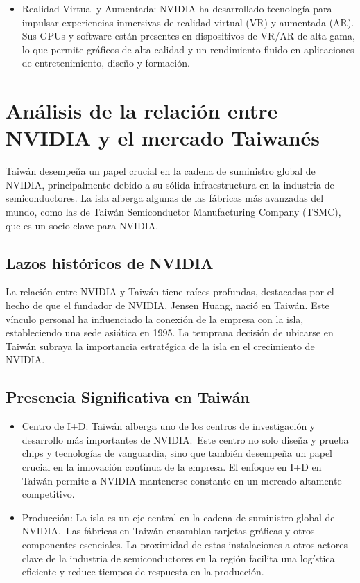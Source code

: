 \documentclass[letterpaper, 12pt]{article}
\begin{document}
\begin{itemize}
      \item Realidad Virtual y Aumentada:
            NVIDIA ha desarrollado tecnología para impulsar experiencias
            inmersivas de realidad virtual (VR) y aumentada (AR). Sus GPUs
            y software están presentes en dispositivos de VR/AR de alta gama,
            lo que permite gráficos de alta calidad y un rendimiento fluido
            en aplicaciones de entretenimiento, diseño y formación.

\end{itemize}

\section{Análisis de la relación entre NVIDIA y el mercado Taiwanés}

Taiwán desempeña un papel crucial en la cadena de suministro
global de NVIDIA, principalmente debido a su sólida
infraestructura en la industria de semiconductores. La isla
alberga algunas de las fábricas más avanzadas del mundo, como
las de Taiwán Semiconductor Manufacturing Company (TSMC), que
es un socio clave para NVIDIA.\@{}

\subsection*{Lazos históricos de NVIDIA}

La relación entre NVIDIA y Taiwán tiene raíces profundas, destacadas
por el hecho de que el fundador de NVIDIA, Jensen Huang, nació en
Taiwán. Este vínculo personal ha influenciado la conexión de la
empresa con la isla, estableciendo una sede asiática en 1995. La
temprana decisión de ubicarse en Taiwán subraya la importancia
estratégica de la isla en el crecimiento de NVIDIA.\@{}

\subsection*{Presencia Significativa en Taiwán}

\begin{itemize}
      \item Centro de I+D:\@{}
            Taiwán alberga uno de los centros de investigación y
            desarrollo más importantes de NVIDIA.~Este centro no solo
            diseña y prueba chips y tecnologías de vanguardia, sino que
            también desempeña un papel crucial en la innovación continua
            de la empresa. El enfoque en I+D en Taiwán permite a NVIDIA
            mantenerse constante en un mercado altamente competitivo.

      \item Producción:
            La isla es un eje central en la cadena de suministro global
            de NVIDIA.~Las fábricas en Taiwán ensamblan tarjetas gráficas
            y otros componentes esenciales. La proximidad de estas
            instalaciones a otros actores clave de la industria de
            semiconductores en la región facilita una logística eficiente
            y reduce tiempos de respuesta en la producción.

\end{itemize}
\end{document}
